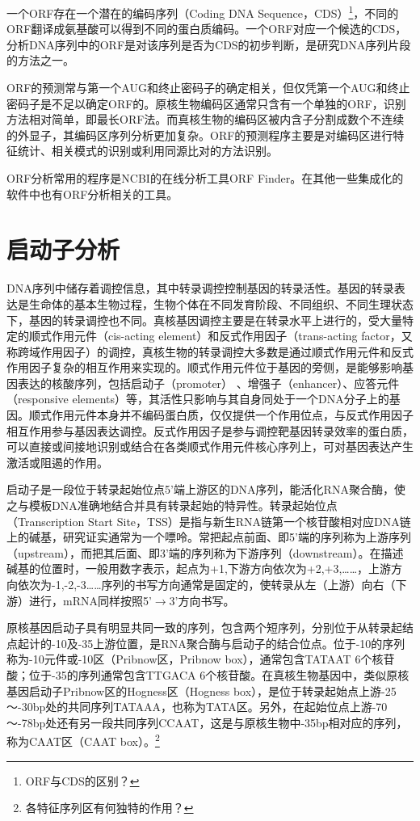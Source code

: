 \documentclass[11pt,a4paper,twoside]{book}
\begin{document}
一个ORF存在一个潜在的编码序列（Coding DNA Sequence，CDS）\footnote{ORF与CDS的区别？}，不同的ORF翻译成氨基酸可以得到不同的蛋白质编码。一个ORF对应一个候选的CDS，分析DNA序列中的ORF是对该序列是否为CDS的初步判断，是研究DNA序列片段的方法之一。

ORF的预测常与第一个AUG和终止密码子的确定相关，但仅凭第一个AUG和终止密码子是不足以确定ORF的。原核生物编码区通常只含有一个单独的ORF，识别方法相对简单，即最长ORF法。而真核生物的编码区被内含子分割成数个不连续的外显子，其编码区序列分析更加复杂。ORF的预测程序主要是对编码区进行特征统计、相关模式的识别或利用同源比对的方法识别。

ORF分析常用的程序是NCBI的在线分析工具ORF Finder。在其他一些集成化的软件中也有ORF分析相关的工具。

\section{启动子分析}
DNA序列中储存着调控信息，其中转录调控控制基因的转录活性。基因的转录表达是生命体的基本生物过程，生物个体在不同发育阶段、不同组织、不同生理状态下，基因的转录调控也不同。真核基因调控主要是在转录水平上进行的，受大量特定的顺式作用元件（cis-acting element）和反式作用因子（trans-acting factor，又称跨域作用因子）的调控，真核生物的转录调控大多数是通过顺式作用元件和反式作用因子复杂的相互作用来实现的。顺式作用元件位于基因的旁侧，是能够影响基因表达的核酸序列，包括启动子（promoter） 、增强子（enhancer）、应答元件（responsive elements）等，其活性只影响与其自身同处于一个DNA分子上的基因。顺式作用元件本身并不编码蛋白质，仅仅提供一个作用位点，与反式作用因子相互作用参与基因表达调控。反式作用因子是参与调控靶基因转录效率的蛋白质，可以直接或间接地识别或结合在各类顺式作用元件核心序列上，可对基因表达产生激活或阻遏的作用。

启动子是一段位于转录起始位点5'端上游区的DNA序列，能活化RNA聚合酶，使之与模板DNA准确地结合并具有转录起始的特异性。转录起始位点（Transcription Start Site，TSS）是指与新生RNA链第一个核苷酸相对应DNA链上的碱基，研究证实通常为一个嘌呤。常把起点前面、即5'端的序列称为上游序列（upstream），而把其后面、即3'端的序列称为下游序列（downstream）。在描述碱基的位置时，一般用数字表示，起点为+1,下游方向依次为+2,+3,……，上游方向依次为-1,-2,-3……序列的书写方向通常是固定的，使转录从左（上游）向右（下游）进行，mRNA同样按照5'$\rightarrow$3'方向书写。

原核基因启动子具有明显共同一致的序列，包含两个短序列，分别位于从转录起结点起计的-10及-35上游位置，是RNA聚合酶与启动子的结合位点。位于-10的序列称为-10元件或-10区（Pribnow区，Pribnow box），通常包含TATAAT 6个核苷酸；位于-35的序列通常包含TTGACA 6个核苷酸。在真核生物基因中，类似原核基因启动子Pribnow区的Hogness区（Hogness box），是位于转录起始点上游-25～-30bp处的共同序列TATAAA，也称为TATA区。另外，在起始位点上游-70～-78bp处还有另一段共同序列CCAAT，这是与原核生物中-35bp相对应的序列，称为CAAT区（CAAT box）。\footnote{各特征序列区有何独特的作用？}
\end{document}
